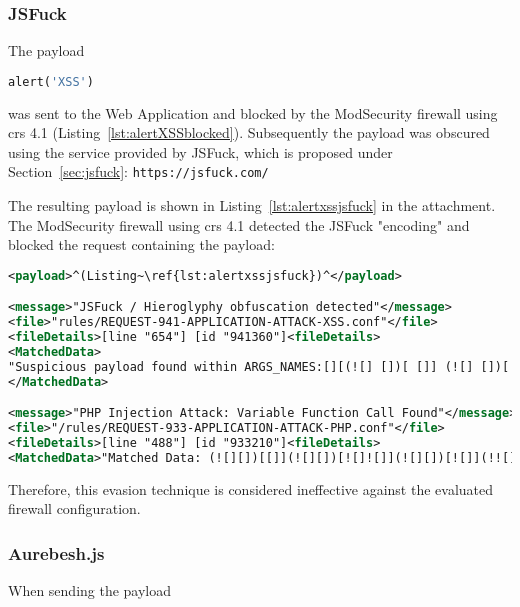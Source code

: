 \subsubsection{JSFuck}
\label{sec:jsfucksingleiter}
The payload 

\begin{lstlisting}[style=basicStyle, language=Python]
alert('XSS')
\end{lstlisting}

was sent to the Web Application and blocked by the ModSecurity firewall using \acrshort{crs} 4.1 (Listing~\ref{lst:alertXSSblocked}). Subsequently the payload was obscured using the service provided by JSFuck, which is proposed under Section~\ref{sec:jsfuck}: \verb|https://jsfuck.com/| 

The resulting payload is shown in Listing~\ref{lst:alertxssjsfuck} in the attachment. The ModSecurity firewall using \acrshort{crs} 4.1 detected the JSFuck "encoding" and blocked the request containing the payload:

\begin{lstlisting}[style=ruleStyle, language=XML, caption=alert('XSS') in JSFuck blocked, label={lst:alertxssjsfuckblocked}]
<payload>^(Listing~\ref{lst:alertxssjsfuck})^</payload>

<message>"JSFuck / Hieroglyphy obfuscation detected"</message>
<file>"rules/REQUEST-941-APPLICATION-ATTACK-XSS.conf"</file>
<fileDetails>[line "654"] [id "941360"]<fileDetails>
<MatchedData>
"Suspicious payload found within ARGS_NAMES:[][(![] [])[ []] (![] [])[! [] ! []] (![] [])[ ! []] (!![] [])[ []]][([][(![] [])[ []] (![] [])[! [] ! []] (![] [])[ ! []] (!![] [])[ []]] [])[ (11337 characters omitted)"
</MatchedData>

<message>"PHP Injection Attack: Variable Function Call Found"</message>
<file>"/rules/REQUEST-933-APPLICATION-ATTACK-PHP.conf"</file>
<fileDetails>[line "488"] [id "933210"]<fileDetails>
<MatchedData>"Matched Data: (![][])[[]](![][])[![]![]](![][])[![]](!![][])[[]]][([][(![][])[[]](![][])[![]![]](![][])[![]](!![][])[[]]][])[![]![]![]](!![][][(![][])[[]](![][])[![]![]](![][])[![]](!![][])[[]]])[![][ (21516 characters omitted)"</MatchedData>
\end{lstlisting}

Therefore, this evasion technique is considered ineffective against the evaluated firewall configuration.


\subsubsection{Aurebesh.js}
\label{sec:aurebeshevaluation}
When sending the payload 

